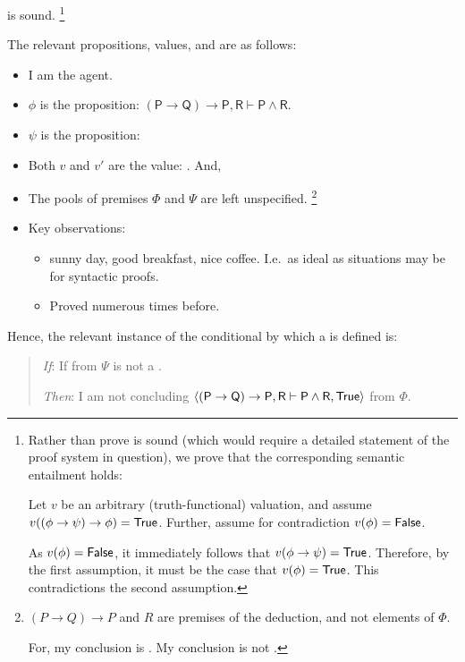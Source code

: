 \begin{note}
  \sqE{} is sound.%
  \footnote{
    \label{prop:sqE-sound}
    Rather than prove \sqE{} is sound (which would require a detailed statement of the proof system in question), we prove that the corresponding semantic entailment holds:

    Let \(v\) be an arbitrary (truth-functional) valuation, and assume \(v((\phi \rightarrow \psi) \rightarrow \phi) = \valI{True}\).
    Further, assume for contradiction \(v(\phi) = \valI{False}\).

    As \(v(\phi) = \valI{False}\), it immediately follows that \(v(\phi \rightarrow \psi) = \valI{True}\).
    Therefore, by the first assumption, it must be the case that \(v(\phi) = \valI{True}\).
    This contradictions the second assumption.
  }

  The relevant propositions, values, and  are as follows:
  \begin{itemize}[noitemsep]
  \item
    I am the agent.
  \item
    \(\phi\) is the proposition: \(\mathsf{(P \rightarrow Q) \rightarrow P, R \vdash P \land R}\).
  \item
    \(\psi\) is the proposition: 
  \item
    Both \(v\) and \(v'\) are the value: .
    And,
  \item
    The pools of premises \(\Phi\) and \(\Psi\) are left unspecified.%
    \footnote{
      \((P \rightarrow Q) \rightarrow P\) and \(R\) are premises of the deduction, and not elements of \(\Phi\).

      For, my conclusion is .
      My conclusion is not .
    }
  \item
    Key observations:
    \begin{itemize}[noitemsep]
    \item
      sunny day, good breakfast, nice coffee.
      I.e.\ as ideal as situations may be for syntactic proofs.
    \item
      Proved \sqE{} numerous times before.
    \end{itemize}
  \end{itemize}

  Hence, the relevant instance of the conditional by which a \requ{} is defined is:

  \begin{quote}
    \begin{itenum}
    \item[\emph{If}:]
      If  from \(\Psi\) is not a \fc{}.
    \item[\emph{Then}:]
      I am not concluding \(\pv{\mathsf{(P \rightarrow Q) \rightarrow P, R \vdash P \land R}}{\valI{True}}\) from \(\Phi\).
    \end{itenum}
  \end{quote}


\end{note}
